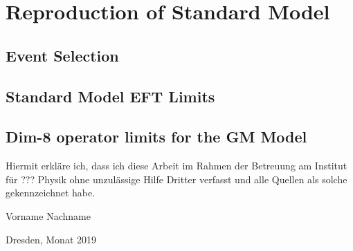 \pagebreak
\chapter{Reproduction of Standard Model}
    \section{Event Selection}
        

   \section{Standard Model EFT Limits}
        

    \section{Dim-8 operator limits for the GM Model}
        





\clearpage
\thispagestyle{empty}
\vspace*{1.5em}

Hiermit erkläre ich, dass ich diese Arbeit im Rahmen der Betreuung am Institut
für ??? Physik ohne unzulässige Hilfe Dritter verfasst und alle Quellen als solche gekennzeichnet habe.

\vspace*{45em}

Vorname Nachname \par
Dresden, Monat 2019
